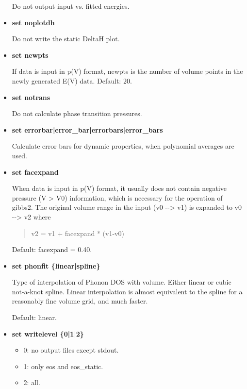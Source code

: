 \documentclass[a4paper]{article}
\begin{document}
\begin{itemize}
Do not output input vs. fitted energies.

\item \textbf{set noplotdh}

Do not write the static DeltaH plot.

\item \textbf{set newpts}

If data is input in p(V) format, newpts is the number of volume
points in the newly generated E(V) data. Default: 20.

\item \textbf{set notrans}

Do not calculate phase transition pressures.

\item \textbf{set errorbar|error\_bar|errorbars|error\_bars}

Calculate error bars for dynamic properties, when polynomial
averages are used.

\item \textbf{set facexpand}

When data is input in p(V) format, it usually does not contain
negative pressure (V > V0) information, which is necessary for the
operation of gibbs2. The original volume range in the input (v0 -{}->
v1) is expanded to v0 -{}-> v2 where

\begin{quote}
v2 = v1 + facexpand * (v1-v0)
\end{quote}

Default: facexpand = 0.40.

\item \textbf{set phonfit \{linear|spline\}}

Type of interpolation of Phonon DOS with volume. Either linear or
cubic not-a-knot spline. Linear interpolation is almost equivalent
to the spline for a reasonably fine volume grid, and much faster.

Default: linear.

\item \textbf{set writelevel \{0|1|2\}}

\begin{itemize}
\item 0: no output files except stdout.

\item 1: only eos and eos\_static.

\item 2: all.
\end{itemize}


\end{itemize}
\end{document}
